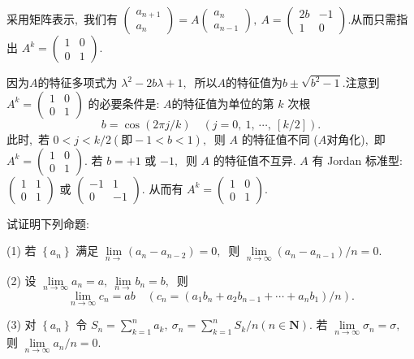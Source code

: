 	\begin{solution}
		采用矩阵表示,\ 我们有 $ \left(\begin{array}{c}a_{n+1} \\ a_{n}\end{array}\right)=A\left(\begin{array}{c}a_{n} \\ a_{n-1}\end{array}\right),\  A=\left(\begin{array}{cc}2 b & -1 \\ 1 & 0\end{array}\right) . $从而只需指 出 $ A^{k}=\left(\begin{array}{ll}1 & 0 \\ 0 & 1\end{array}\right) .$
		
		因为$  A $的特征多项式为  $\lambda^{2}-2 b \lambda+1 ,\ $ 所以$  A  $的特征值为$  b \pm \sqrt{b^{2}-1} . $注意到$  A^{k}=\left(\begin{array}{ll}1 & 0 \\ 0 & 1\end{array}\right) $ 的必要条件是: $ A  $的特征值为单位的第 $ k $ 次根
		$$b=\cos (2 \pi j / k) \quad(j=0,\ 1,\  \cdots,\ [k / 2]) .$$
		此时,\  若 $ 0<j<k / 2  (\text{即}  -1<b<1  ),\ $ 则  $A$  的特征值不同 ($A$对角化),\  即 $ A^{k}=   \left(\begin{array}{ll}1 & 0 \\ 0 & 1\end{array}\right) .$ 若 $ b=+1 $ 或  $-1 ,\ $ 则  $A$  的特征值不互异. $ A $ 有 Jordan 标准型:  $\left(\begin{array}{ll}1 & 1 \\ 0 & 1\end{array}\right) $ 或  $\left(\begin{array}{rr}-1 & 1 \\ 0 & -1\end{array}\right) .$ 从而有  $A^{k}=\left(\begin{array}{ll}1 & 0 \\ 0 & 1\end{array}\right) .$
	\end{solution}
	\newpage
	\begin{problem}
		试证明下列命题:
		
		(1) 若  $\left\{a_{n}\right\}$  满足 $ \lim\limits _{n \rightarrow}\left(a_{n}-a_{n-2}\right)=0 ,\ $ 则  $\lim\limits_{n \rightarrow \infty}\left(a_{n}-a_{n-1}\right) / n=0 .$
		
		(2) 设  $\lim\limits _{n \rightarrow \infty} a_{n}=a,\  \lim\limits _{n \rightarrow} b_{n}=b ,\ $ 则
		$$\lim\limits_{n \rightarrow \infty}c_n=a b \quad\left(c_{n}=\left(a_{1} b_{n}+a_{2} b_{n-1}+\cdots+a_{n} b_{1}\right) / n\right) .$$
		
		(3) 对  $\left\{a_{n}\right\}$  令  $S_{n}=\sum\limits_{k=1}^{n} a_{k},\  \sigma_{n}=\sum\limits_{k=1}^{n} S_{k} / n(n \in \mathbf{N}) .$ 若  $\lim\limits_{n \rightarrow \infty} \sigma_{n}=\sigma ,\ $ 则  $\lim\limits _{n \rightarrow \infty} a_{n} / n=0 .$
	\end{problem}
	
